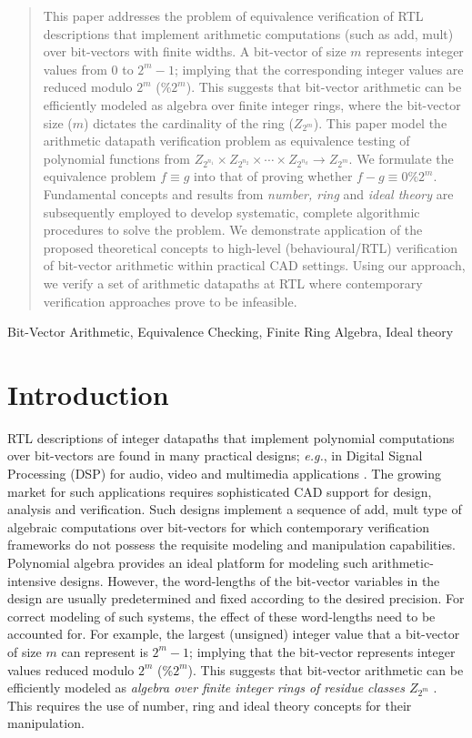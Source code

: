 \begin{abstract}
This paper addresses the problem of equivalence verification of RTL
descriptions that implement arithmetic computations (such as {\sc add,
mult}) over bit-vectors with finite widths. A bit-vector of size $m$
represents integer values from $0$ to $2^m -1$; implying that the
corresponding integer values are reduced modulo $2^m$ ($\% 2^m$). This
suggests that bit-vector arithmetic can be efficiently modeled as
algebra over finite integer rings, where the bit-vector size ($m$)
dictates the cardinality of the ring ($Z_{2^m}$). This paper model the
arithmetic datapath verification problem as equivalence testing of
polynomial functions from $Z_{2^{n_1}} \times Z_{2^{n_2}} \times
\cdots \times Z_{2^{n_d}} \rightarrow Z_{2^m}$. We formulate the
equivalence problem $f \equiv g$ into that of proving whether $f-g
\equiv 0 \% 2^m$. Fundamental concepts and results from {\it number,
ring} and {\it ideal theory} are subsequently employed to develop
systematic, complete algorithmic procedures to solve the problem. We
demonstrate application of the proposed theoretical concepts to
high-level (behavioural/RTL) verification of bit-vector arithmetic
within practical CAD settings. Using our approach, we verify a set of
arithmetic datapaths at RTL where contemporary verification approaches
prove to be infeasible.
\end{abstract}

\begin{keywords}
Bit-Vector Arithmetic, Equivalence Checking, Finite Ring Algebra,
Ideal theory
\end{keywords}

\section{Introduction}\label{sec:intro}
RTL descriptions of integer datapaths that implement polynomial
computations over bit-vectors are found in many practical designs;
{\it e.g.}, in Digital Signal Processing (DSP) for audio, video and
multimedia applications \cite{mathews:book}. The growing market for
such applications requires sophisticated CAD support for design,
analysis and verification. Such designs implement a sequence of {\sc
add, mult} type of algebraic computations over bit-vectors for
which contemporary verification frameworks do not possess the
requisite modeling and manipulation capabilities. Polynomial algebra
provides an ideal platform for modeling such arithmetic-intensive
designs. However, the word-lengths of the bit-vector variables in the
design are usually predetermined and fixed according to the desired
precision. For correct modeling of such systems, the effect of these
word-lengths need to be accounted for. For example, the largest
(unsigned) integer value that a bit-vector of size $m$ can represent
is $2^m-1$; implying that the bit-vector represents integer values
reduced modulo $2^m$ ($\% 2^m$). This suggests that bit-vector
arithmetic can be efficiently modeled as {\it algebra over finite
  integer rings of residue classes $Z_{2^m}$} \cite{allenby:book}.
This requires the use of number, ring and ideal theory concepts for
their manipulation. 

